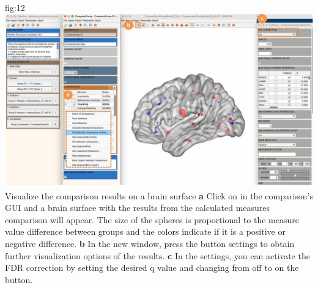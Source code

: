 \documentclass[justified]{tufte-handout}
\begin{document}
	{fig:12}
	{\includegraphics{fig12.jpg}}
	{Visualize the comparison results on a brain surface}
	{
 	{\bf a} Click on  in the comparison's GUI and a brain surface with the results from the calculated measures comparison will appear. The size of the spheres is proportional to the measure value difference between groups and the colors indicate if it is a positive or negative difference.   
	{\bf b} In the new window, press the button settings to obtain further visualization options of the results. 
	{\bf c} In the settings, you can activate the FDR correction by setting the desired q value and changing from off to on the button.
	}

\end{document}
